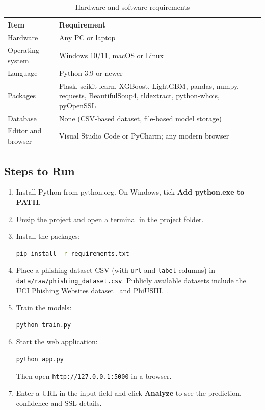 \documentclass[11pt,a4paper]{article}
\begin{document}
\begin{table}[H]
\centering
\begin{tabularx}{\textwidth}{@{}p{3.6cm}L@{}}
\toprule
\textbf{Item} & \textbf{Requirement} \\ \midrule
Hardware & Any PC or laptop \\
Operating system & Windows 10/11, macOS or Linux \\
Language & Python 3.9 or newer \\
Packages & Flask, scikit-learn, XGBoost, LightGBM, pandas, numpy, requests, BeautifulSoup4, tldextract, python-whois, pyOpenSSL \\
Database & None (CSV-based dataset, file-based model storage) \\
Editor and browser & Visual Studio Code or PyCharm; any modern browser \\ \bottomrule
\end{tabularx}
\caption{Hardware and software requirements}
\end{table}

\subsection{Steps to Run}

\begin{enumerate}
  \item Install Python from python.org. On Windows, tick \textbf{Add python.exe to PATH}.
  \item Unzip the project and open a terminal in the project folder.
  \item Install the packages:
  \begin{lstlisting}[language=bash]
pip install -r requirements.txt
  \end{lstlisting}
  \item Place a phishing dataset CSV (with \texttt{url} and \texttt{label} columns) in \texttt{data/raw/phishing\_dataset.csv}. Publicly available datasets include the UCI Phishing Websites dataset~\cite{uci_phishing} and PhiUSIIL~\cite{phiusiil2024}.
  \item Train the models:
  \begin{lstlisting}[language=bash]
python train.py
  \end{lstlisting}
  \item Start the web application:
  \begin{lstlisting}[language=bash]
python app.py
  \end{lstlisting}
  Then open \texttt{http://127.0.0.1:5000} in a browser.
  \item Enter a URL in the input field and click \textbf{Analyze} to see the prediction, confidence and SSL details.
\end{enumerate}
\end{document}

